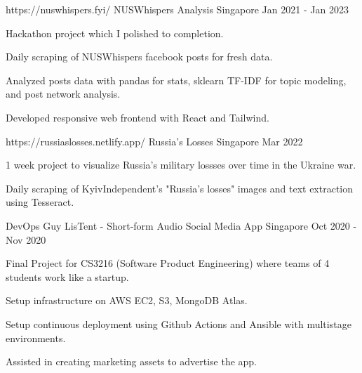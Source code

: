 

\begin{cventries}

  \cventry
    {https://nuswhispers.fyi/} %
    {NUSWhispers Analysis} %
    {Singapore} %
    {Jan 2021 - Jan 2023} %
    {
      \begin{cvitems} %
        \item {Hackathon project which I polished to completion.}
        \item {Daily scraping of NUSWhispers facebook posts for fresh data.}
        \item {Analyzed posts data with pandas for stats, sklearn TF-IDF for topic modeling, and post network analysis.}
        \item {Developed responsive web frontend with React and Tailwind.}
      \end{cvitems}
    }

  \cventry
    {https://russiaslosses.netlify.app/} %
    {Russia's Losses} %
    {Singapore} %
    {Mar 2022} %
    {
      \begin{cvitems} %
        \item {1 week project to visualize Russia's military lossses over time in the Ukraine war.}
        \item {Daily scraping of KyivIndependent's "Russia's losses" images and text extraction using Tesseract.}
      \end{cvitems}
    }

  \cventry
    {DevOps Guy} %
    {LisTent - Short-form Audio Social Media App} %
    {Singapore} %
    {Oct 2020 - Nov 2020} %
    {
      \begin{cvitems} %
        \item {Final Project for CS3216 (Software Product Engineering) where teams of 4 students work like a startup.}
        \item {Setup infrastructure on AWS EC2, S3, MongoDB Atlas.}
        \item {Setup continuous deployment using Github Actions and Ansible with multistage environments.}
        \item {Assisted in creating marketing assets to advertise the app.}
      \end{cvitems}
    }


\end{cventries}
